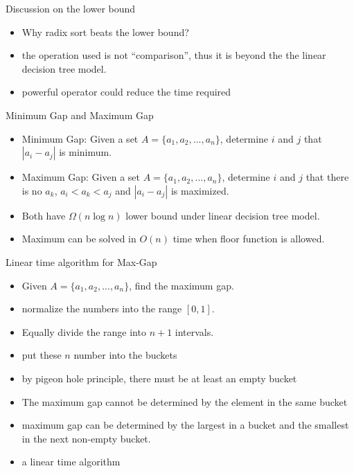 \documentclass{beamer}
\begin{document}
\begin{frame}{}
\begin{center}
Discussion on the lower bound
\end{center}
\begin{itemize}
\item Why radix sort beats the lower bound?
\item the operation used is not ``comparison'', thus it is beyond the
 the linear decision tree model.  
\item powerful operator could reduce the time required
\end{itemize}
\end{frame}

\begin{frame}{}
\begin{center}
Minimum Gap and Maximum Gap
\end{center}
\begin{itemize}
\item Minimum Gap:
  Given a set $A=\{a_1, a_2, ..., a_n\}$, determine $i$ and $j$ that
 $|a_i-a_j|$ is minimum.
\item Maximum Gap:
  Given a set $A=\{a_1, a_2, ..., a_n\}$, determine $i$ and $j$ that
  there is no $a_k$, $a_i<a_k<a_j$ and $|a_i-a_j|$ is maximized.  
\item Both have $\Omega(n\log n)$ lower bound under linear decision tree model.
\item Maximum can be solved in $O(n)$ time when floor function is allowed.
\end{itemize}
\end{frame}

\begin{frame}{}
\begin{center}
Linear time algorithm for Max-Gap
\end{center}
\begin{itemize}
\item Given $A=\{a_1,a_2,...,a_n\}$, find the maximum gap.
\item normalize the numbers into the range $[0,1]$.
\item Equally divide the range into $n+1$ intervals.
\item put these $n$ number into the buckets
\end{itemize}
\end{frame}

\begin{frame}{}
\begin{itemize}
\item by pigeon hole principle, there must be at least an empty bucket
\item The maximum gap cannot be determined by the element in the same bucket
\item maximum gap can be determined by the largest in a bucket and the smallest
 in the next non-empty bucket.
\item a linear time algorithm
\end{itemize}
\end{frame}

\end{document}
